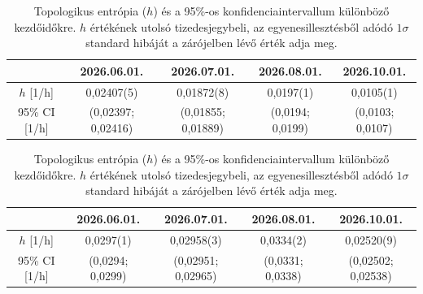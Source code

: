 \documentclass[12pt,a4paper]{article}
\begin{document}
\begin{table}[H]
    \centering
    \begin{subtable}{\textwidth}
        \centering
        \begin{tabular}{|c|c|c|c|c|}\hline
            & \textbf{2026.06.01.} & \textbf{2026.07.01.} & \textbf{2026.08.01.} & \textbf{2026.10.01.} \\\hline
            $h$ [1/h] & 0,02407(5) & 0,01872(8) & 0,0197(1) & 0,0105(1) \\\hline
            95\% CI [1/h] & (0,02397; 0,02416) & (0,01855; 0,01889) & (0,0194; 0,0199) & (0,0103; 0,0107) \\\hline
        \end{tabular}
        \caption{AIFS}
    \end{subtable}

    \vspace{0.6cm}

    \begin{subtable}{\textwidth}
        \centering
        \begin{tabular}{|c|c|c|c|c|}\hline
            & \textbf{2026.06.01.} & \textbf{2026.07.01.} & \textbf{2026.08.01.} & \textbf{2026.10.01.} \\\hline
            $h$ [1/h] & 0,0297(1) & 0,02958(3) & 0,0334(2) & 0,02520(9) \\\hline
            95\% CI [1/h] & (0,0294; 0,0299) & (0,02951; 0,02965) & (0,0331; 0,0338) & (0,02502; 0,02538) \\\hline
        \end{tabular}
        \caption{IFS}
    \end{subtable}
    \caption{Topologikus entrópia ($h$) és a 95\%-os konfidenciaintervallum különböző kezdőidőkre. $h$ értékének utolsó tizedesjegybeli, az egyenesillesztésből adódó $1 \sigma$ standard hibáját a zárójelben lévő érték adja meg.}
    \label{tab:hun700_top}
\end{table}
\end{document}
